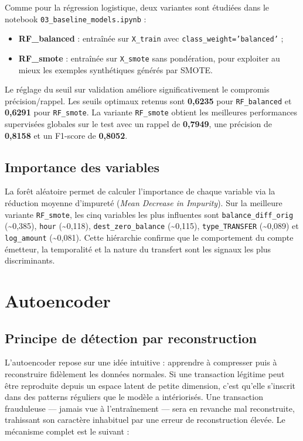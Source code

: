 \documentclass[12pt,a4paper,twoside]{report}
\begin{document}
Comme pour la régression logistique, deux variantes sont étudiées dans le notebook \texttt{03\_baseline\_models.ipynb} :
\begin{itemize}
  \item \textbf{RF\_balanced} : entraînée sur \texttt{X\_train} avec \texttt{class\_weight='balanced'} ;
  \item \textbf{RF\_smote} : entraînée sur \texttt{X\_smote} sans pondération, pour exploiter au mieux les exemples synthétiques générés par SMOTE.
\end{itemize}

Le réglage du seuil sur validation améliore significativement le compromis précision/rappel. Les seuils optimaux retenus sont \textbf{0,6235} pour \texttt{RF\_balanced} et \textbf{0,6291} pour \texttt{RF\_smote}. La variante \texttt{RF\_smote} obtient les meilleures performances supervisées globales sur le test avec un rappel de \textbf{0,7949}, une précision de \textbf{0,8158} et un F1-score de \textbf{0,8052}.

\subsection{Importance des variables}

La forêt aléatoire permet de calculer l'importance de chaque variable via la réduction moyenne d'impureté (\textit{Mean Decrease in Impurity}). Sur la meilleure variante \texttt{RF\_smote}, les cinq variables les plus influentes sont \texttt{balance\_diff\_orig} (\textasciitilde0,385), \texttt{hour} (\textasciitilde0,118), \texttt{dest\_zero\_balance} (\textasciitilde0,115), \texttt{type\_TRANSFER} (\textasciitilde0,089) et \texttt{log\_amount} (\textasciitilde0,081). Cette hiérarchie confirme que le comportement du compte émetteur, la temporalité et la nature du transfert sont les signaux les plus discriminants.

\section{Autoencoder}

\subsection{Principe de détection par reconstruction}

L'autoencoder repose sur une idée intuitive : apprendre à compresser puis à reconstruire fidèlement les données normales. Si une transaction légitime peut être reproduite depuis un espace latent de petite dimension, c'est qu'elle s'inscrit dans des patterns réguliers que le modèle a intériorisés. Une transaction frauduleuse --- jamais vue à l'entraînement --- sera en revanche mal reconstruite, trahissant son caractère inhabituel par une erreur de reconstruction élevée. Le mécanisme complet est le suivant :
\end{document}
